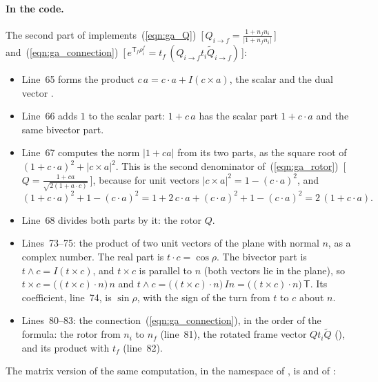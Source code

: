 \paragraph{In the code.} The second part of  implements~(\ref{eqn:ga_Q})~[\,$Q_{i\to f} = \frac{1 + n_fn_i}{|1 + n_fn_i|}$\,] and~(\ref{eqn:ga_connection})~[\,$e^{\mathsf T_f\rho_i^f} = t_f\,(Q_{i\to f}t_i\widetilde Q_{i\to f})$\,]:

\begin{itemize}
\item Line~65 forms the product $c\,a = c\cdot a + I(c\times a)$, the scalar  and the dual vector .
\item Line~66 adds $1$ to the scalar part: $1 + c\,a$ has the scalar part $1 + c\cdot a$ and the same bivector part.
\item Line~67 computes the norm $|1 + ca|$ from its two parts, as the square root of $(1 + c\cdot a)^2 + |c\times a|^2$. This is the second denominator of~(\ref{eqn:ga_rotor})~[\,$Q = \frac{1 + ca}{\sqrt{2(1 + a\cdot c)}}$\,], because for unit vectors $|c\times a|^2 = 1 - (c\cdot a)^2$, and
\begin{equation*}
(1 + c\cdot a)^2 + 1 - (c\cdot a)^2 = 1 + 2\,c\cdot a + (c\cdot a)^2 + 1 - (c\cdot a)^2 = 2\,(1 + c\cdot a) .
\end{equation*}
\item Line~68 divides both parts by it: the rotor $Q$.
\item Lines~73--75: the product of two unit vectors of the plane with normal $n$, as a complex number. The real part is $t\cdot c = \cos\rho$. The bivector part is $t\wedge c = I(t\times c)$, and $t\times c$ is parallel to $n$ (both vectors lie in the plane), so $t\times c = \big((t\times c)\cdot n\big)\, n$ and $t\wedge c = \big((t\times c)\cdot n\big)\, In = \big((t\times c)\cdot n\big)\,\mathsf T$. Its coefficient, line~74, is $\sin\rho$, with the sign of the turn from $t$ to $c$ about $n$.
\item Lines~80--83: the connection~(\ref{eqn:ga_connection}), in the order of the formula: the rotor from $n_i$ to $n_f$ (line~81), the rotated frame vector $Q t_i\widetilde Q$ (), and its product with $t_f$ (line~82).
\end{itemize}
The matrix version of the same computation, in the  namespace of , is  and  of :

